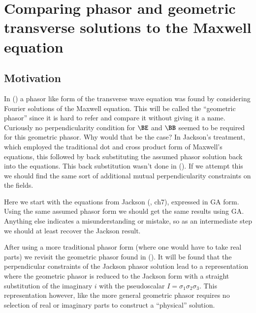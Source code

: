 %

\chapter{Comparing phasor and geometric transverse solutions to the Maxwell equation}
\label{chap:transverseWave}
{}
\date{August 6, 2009}

\beginArtWithToc

\section{Motivation}

In () a phasor like form of the transverse wave equation was found by considering Fourier solutions of the Maxwell equation.  This will be called the ``geometric phasor'' since it is hard to refer and compare it without giving it a name.  Curiously no perpendicularity condition for $\BE$ and $\BB$ seemed to be required for this geometric phasor.  Why would that be the case?  In Jackson's treatment, which employed the traditional dot and cross product form of Maxwell's equations, this followed by back substituting the assumed phasor solution back into the equations.  This back substitution wasn't done in ().  If we attempt this we should find the same sort of additional mutual perpendicularity constraints on the fields.

Here we start with the equations from Jackson (\cite{jackson1975cew}, ch7), expressed in GA form.  Using the same assumed phasor form we should get the same results using GA.  Anything else indicates a misunderstanding or mistake, so as an intermediate step we should at least recover the Jackson result.

After using a more traditional phasor form (where one would have to take real parts) we revisit the geometric phasor found in ().  It will be found that the perpendicular constraints of the Jackson phasor solution lead to a representation where the geometric phasor is reduced to the Jackson form with a straight substitution of the imaginary $i$ with the pseudoscalar $I = \sigma_1\sigma_2\sigma_3$.  This representation however, like the more general geometric phasor requires no selection of real or imaginary parts to construct a ``physical'' solution.


